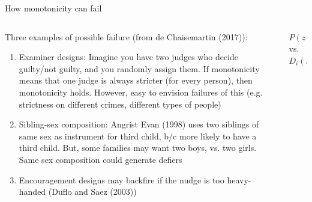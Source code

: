 \documentclass[notes,11pt, aspectratio=169]{beamer}
\newenvironment{wideitemize}{\itemize\addtolength{\itemsep}{10pt}}{\enditemize}
\begin{document}
\begin{frame}{How monotonicity can fail}
  \begin{columns}[T] %
    \begin{column}{0.7\textwidth}
      \begin{wideitemize}
      \item Three examples of possible failure (from de Chaisemartin
        (2017)):
        \begin{enumerate}
        \item<1-> Examiner designs: Imagine you have two judges who
          decide guilty/not guilty, and you randomly assign them. If
          monotonicity means that one judge is always stricter (for
          every person), then monotonicity holds. However, easy to
          envision failures of this (e.g. strictness on different
          crimes, different types of people)
        \item<2-> Sibling-sex composition: Angrist Evan (1998) uses
          two siblings of same sex as instrument for third child, b/c
          more likely to have a third child. But, some families may
          want two boys, vs. two girls. Same sex composition could
          generate defiers
        \item<3-> Encouragement designs may backfire if the nudge is
          too heavy-handed (Duflo and Saez (2003))
        \end{enumerate}
      \end{wideitemize}
\end{column}
\begin{column}{0.3\textwidth}
  \vspace{50pt}
  \begin{center}
  $P(z) > P(z')$\\
  vs.\\
  $D_{i}(z) \geq D_{i}(z') \forall i$
  \end{center}
\end{column}
\end{columns}

\end{frame}
\end{document}
